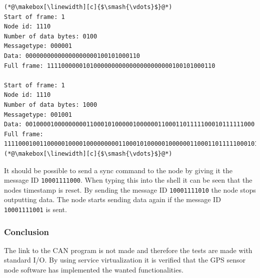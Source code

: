\begin{lstlisting}[caption=Struct for data packet.,label=code:output_node]
(*@\makebox[\linewidth][c]{$\smash{\vdots}$}@*)
Start of frame: 1
Node id: 1110
Number of data bytes: 0100
Messagetype: 000001
Data: 00000000000000000000100101000110
Full frame: 11110000001010000000000000000000000100101000110

Start of frame: 1
Node id: 1110
Number of data bytes: 1000
Messagetype: 001001
Data: 0010000100000000011000101000001000000110001101111100010111111000
Full frame: 1111000100110000010000100000000011000101000001000000110001101111100010111111000
(*@\makebox[\linewidth][c]{$\smash{\vdots}$}@*)
\end{lstlisting}

It should be possible to send a sync command to the node by giving it the message ID \texttt{10001111000}.
When typing this into the shell it can be seen that the nodes timestamp is reset.
By sending the message ID \texttt{10001111010} the node stops outputting data.
The node starts sending data again if the message ID \texttt{10001111001} is sent.


\subsubsection*{Conclusion}
The link to the CAN program is not made and therefore the tests are made with standard I/O.
By using service virtualization it is verified that the GPS sensor node software has implemented the wanted functionalities.
